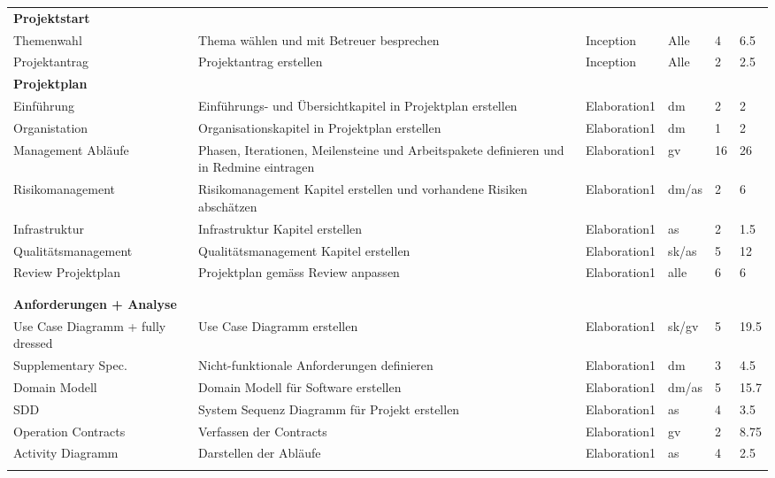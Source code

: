 \documentclass[a4,12pt]{scrartcl}
\begin{document}
\begin{landscape}
\begin{longtable}{ p{5.5cm} p{8cm} l l p{1cm} p{1cm} }
\textbf{Projektstart}&&&&\\ \addlinespace
Themenwahl & Thema wählen und mit Betreuer besprechen & Inception & Alle & 4 & 6.5\\ \addlinespace
Projektantrag & Projektantrag erstellen & Inception & Alle & 2 & 2.5\\ \addlinespace
\textbf{Projektplan} &  &  &  &  & \\ \addlinespace
Einführung & Einführungs- und Übersichtkapitel in Projektplan erstellen  & Elaboration1  & dm  & 2 &2 \\ \addlinespace
Organistation & Organisationskapitel in Projektplan erstellen   & Elaboration1  & dm  & 1  &2 \\ \addlinespace
Management Abläufe & Phasen, Iterationen, Meilensteine und Arbeitspakete definieren und in Redmine eintragen  & Elaboration1  & gv  & 16  & 26 \\ \addlinespace
Risikomanagement & Risikomanagement Kapitel erstellen und vorhandene Risiken abschätzen  & Elaboration1  & dm/as  & 2 & 6 \\ \addlinespace
Infrastruktur & Infrastruktur Kapitel erstellen & Elaboration1  & as  & 2  &1.5 \\ \addlinespace
Qualitätsmanagement & Qualitätsmanagement Kapitel erstellen & Elaboration1 & sk/as   & 5 &12 \\ \addlinespace
Review Projektplan & Projektplan gemäss Review anpassen & Elaboration1 & alle & 6 & 6 \\ \addlinespace
&  &  &  &  & \\ \addlinespace
&  &  &  &  & \\ \addlinespace
\textbf{Anforderungen + Analyse} &  &  &  &  & \\ \addlinespace
Use Case Diagramm + fully dressed & Use Case Diagramm erstellen & Elaboration1  & sk/gv  & 5  &19.5 \\ \addlinespace
Supplementary Spec. & Nicht-funktionale Anforderungen definieren & Elaboration1  &  dm & 3 &4.5 \\ \addlinespace
Domain Modell& Domain Modell für Software erstellen  & Elaboration1  & dm/as  & 5 &15.7  \\ 
SDD& System Sequenz Diagramm für Projekt erstellen & Elaboration1  & as  & 4  & 3.5 \\ \addlinespace
Operation Contracts& Verfassen der Contracts  & Elaboration1  & gv & 2  & 8.75\\ \addlinespace
Activity Diagramm & Darstellen der Abläufe  & Elaboration1  & as & 4  & 2.5 \\ \addlinespace

\end{longtable}
\end{landscape}
\end{document}
